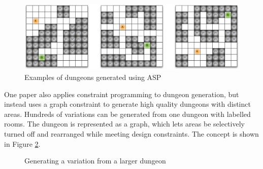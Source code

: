\begin{figure}[H]
    \centering
    \includegraphics[width=\textwidth, height=0.3\textheight, keepaspectratio]{Images/ASPDungeons.png}
    \caption{Examples of dungeons generated using ASP \cite{pcgbook}}
    \label{fig:aspDungeons}
\end{figure}

One paper \cite{Graph_Constraint_Dungeon} also applies constraint programming to dungeon generation, but instead uses a graph constraint to generate high quality dungeons with distinct areas. Hundreds of variations can be generated from one dungeon with labelled rooms. The dungeon is represented as a graph, which lets areas be selectively turned off and rearranged while meeting design constraints. The concept is shown in Figure \ref{fig:graphDungeon}.

\begin{figure}[H]
    \centering
    \hfill
    \caption{Generating a variation from a larger dungeon \cite{Graph_Constraint_Dungeon}}
    \label{fig:graphDungeon}
\end{figure}

